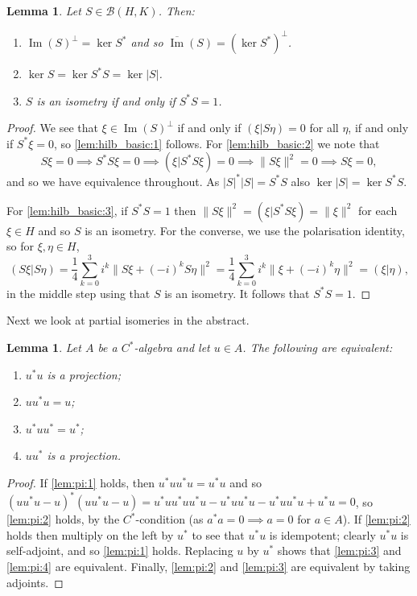 \documentclass[twoside,a4paper,12pt]{article}
\theoremstyle{plain}
\newtheorem{lemma}[proposition]{Lemma}
\theoremstyle{definition}
\newcommand{\mc}{\mathcal}
\newcommand{\im}{\operatorname{Im}}
\begin{document}
\begin{lemma}\label{lem:hilb_basic}
Let $S\in\mc B(H,K)$.  Then:
\begin{enumerate}[(1)]
   \item\label{lem:hilb_basic:1}
   $\im(S)^\perp = \ker S^*$ and so $\overline{\im}(S) = (\ker S^*)^\perp$.
   \item\label{lem:hilb_basic:2}
   $\ker S = \ker S^*S = \ker |S|$.
   \item\label{lem:hilb_basic:3}
   $S$ is an isometry if and only if $S^*S=1$.
\end{enumerate}
\end{lemma}
\begin{proof}
We see that $\xi\in\im(S)^\perp$ if and only if $(\xi|S\eta)=0$ for all $\eta$, if and only if $S^*\xi=0$, so \ref{lem:hilb_basic:1} follows.  For \ref{lem:hilb_basic:2} we note that
\[ S\xi=0 \implies
S^*S\xi=0 \implies
(\xi|S^*S\xi)=0 \implies
\|S\xi\|^2=0 \implies
S\xi=0, \]
and so we have equivalence throughout.  As $|S|^*|S| = S^*S$ also $\ker |S| = \ker S^*S$.

For \ref{lem:hilb_basic:3}, if $S^*S=1$ then $\|S\xi\|^2 = (\xi|S^*S\xi) = \|\xi\|^2$ for each $\xi\in H$ and so $S$ is an isometry.  For the converse, we use the polarisation identity, so for $\xi, \eta\in H$,
\[ (S\xi|S\eta) = \frac14 \sum_{k=0}^3 i^k \|S\xi + (-i)^k S\eta\|^2 
= \frac14 \sum_{k=0}^3 i^k \|\xi + (-i)^k \eta\|^2 
= (\xi|\eta), \]
in the middle step using that $S$ is an isometry.  It follows that $S^*S=1$.
\end{proof}

Next we look at partial isomeries in the abstract.

\begin{lemma}\label{lem:pi}
Let $A$ be a $C^*$-algebra and let $u\in A$.  The following are equivalent:
\begin{enumerate}[(1)]
   \item\label{lem:pi:1} $u^*u$ is a projection;
   \item\label{lem:pi:2} $uu^*u = u$;
   \item\label{lem:pi:3} $u^*uu^* = u^*$;
   \item\label{lem:pi:4} $uu^*$ is a projection.
\end{enumerate}
\end{lemma}
\begin{proof}
If \ref{lem:pi:1} holds, then $u^*u u^*u = u^*u$ and so $(uu^*u-u)^*(uu^*u-u) = u^*uu^*uu^*u - u^*uu^*u - u^*uu^*u + u^*u = 0$, so \ref{lem:pi:2} holds, by the $C^*$-condition (as $a^*a=0 \implies a=0$ for $a\in A$).  If \ref{lem:pi:2} holds then multiply on the left by $u^*$ to see that $u^*u$ is idempotent; clearly $u^*u$ is self-adjoint, and so \ref{lem:pi:1} holds.  Replacing $u$ by $u^*$ shows that \ref{lem:pi:3} and \ref{lem:pi:4} are equivalent.  Finally, \ref{lem:pi:2} and \ref{lem:pi:3} are equivalent by taking adjoints.
\end{proof}
\end{document}
